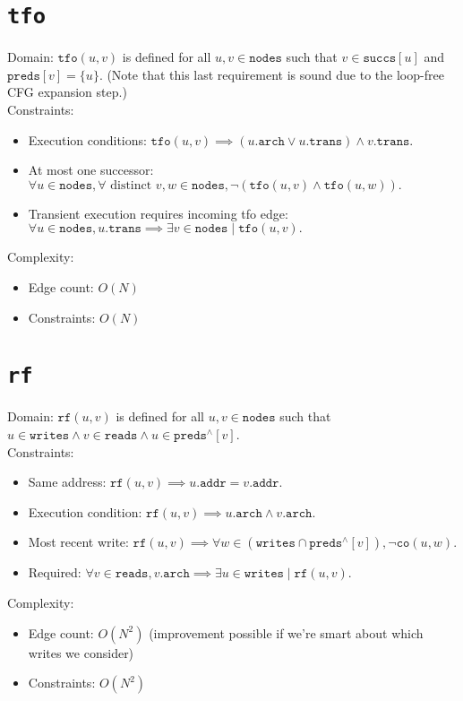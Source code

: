 \documentclass{article}
\newcommand{\tfo}{\texttt{tfo}}
\newcommand{\preds}{\texttt{preds}}
\newcommand{\succs}{\texttt{succs}}
\newcommand{\nodes}{\texttt{nodes}}
\newcommand{\arch}{\texttt{arch}}
\newcommand{\trans}{\texttt{trans}}
\newcommand{\addr}{\texttt{addr}}
\newcommand{\rf}{\texttt{rf}}
\newcommand{\co}{\texttt{co}}
\newcommand{\closure}[1]{#1^\wedge}
\newcommand{\writes}{\texttt{writes}}
\newcommand{\reads}{\texttt{reads}}
\begin{document}
\section{\tfo}

Domain: $\tfo(u,v)$ is defined for all $u,v \in \nodes$ such that $v \in \succs[u]$ and $\preds[v] = \{u\}$.
(Note that this last requirement is sound due to the loop-free CFG expansion step.)
\\
Constraints:
\begin{itemize}
\item Execution conditions: $\tfo(u,v) \implies \left( u.\arch \vee u.\trans \right) \wedge v.\trans.$
\item At most one successor:
  $\forall u \in \nodes, \forall \mbox{ distinct } v,w \in \nodes, \neg \left( \tfo(u,v) \wedge \tfo(u, w) \right).$
\item Transient execution requires incoming tfo edge:
  $\forall u \in \nodes, u.\trans \implies \exists v \in \nodes \mid
  \tfo(u,v).$
\end{itemize}
Complexity:
\begin{itemize}
\item Edge count: $O(N)$
\item Constraints: $O(N)$
\end{itemize}


\section{\rf}
Domain: $\rf(u,v)$ is defined for all $u,v \in \nodes$ such that $u \in \writes \wedge v \in \reads \wedge u \in \closure{\preds}[v]$.
\\
Constraints:
\begin{itemize}
\item Same address: $\rf(u,v) \implies u.\addr = v.\addr$.
\item Execution condition: $\rf(u,v) \implies u.\arch \wedge v.\arch$.
\item Most recent write: $\rf(u,v) \implies
  \forall w \in \left( \writes \cap \closure{\preds}[v] \right), \neg \co(u,w)$.
\item Required: $\forall v \in \reads, v.\arch \implies \exists u \in \writes \mid \rf(u,v)$.
\end{itemize}
Complexity:
\begin{itemize}
\item Edge count: $O(N^2)$ (improvement possible if we're smart about which writes we consider)
\item Constraints: $O(N^2)$
\end{itemize}
\end{document}
